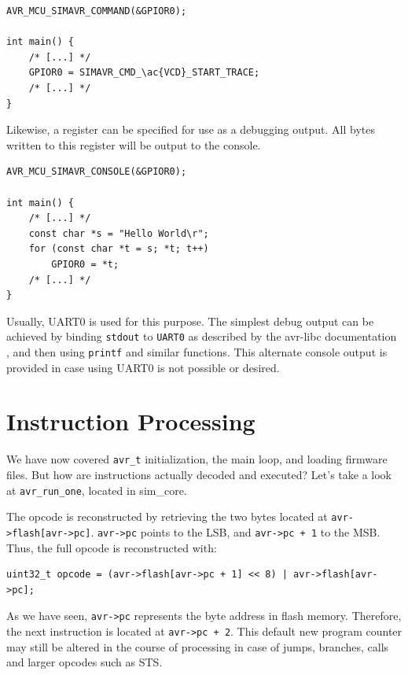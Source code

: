 \begin{lstlisting}
AVR_MCU_SIMAVR_COMMAND(&GPIOR0);

int main() {
    /* [...] */
    GPIOR0 = SIMAVR_CMD_\ac{VCD}_START_TRACE;
    /* [...] */
}
\end{lstlisting}

Likewise, a register can be specified for use as a debugging output. All bytes
written to this register will be output to the console.

\begin{lstlisting}
AVR_MCU_SIMAVR_CONSOLE(&GPIOR0);

int main() {
    /* [...] */
    const char *s = "Hello World\r";
    for (const char *t = s; *t; t++)
        GPIOR0 = *t;
    /* [...] */
}
\end{lstlisting}

Usually, UART0 is used for this purpose. The simplest debug output can be achieved
by binding \lstinline|stdout| to \lstinline|UART0| as described by the avr-libc
documentation \cite{libc}, and then using \lstinline|printf| and similar functions.
This alternate console output is provided in case using UART0 is not possible or desired.



\section{Instruction Processing} \label{section:instruction_processing}

We have now covered \lstinline|avr_t| initialization, the main loop, and loading
firmware files. But how are instructions actually decoded and executed? Let's
take a look at \lstinline|avr_run_one|, located in sim\_core.

The opcode is reconstructed by retrieving the two bytes located at
\lstinline|avr->flash[avr->pc]|. \lstinline|avr->pc| points to the \ac{LSB}, and
\lstinline|avr->pc + 1| to the \ac{MSB}. Thus, the full opcode is reconstructed with:

\begin{lstlisting}
uint32_t opcode = (avr->flash[avr->pc + 1] << 8) | avr->flash[avr->pc];
\end{lstlisting}

As we have seen, \lstinline|avr->pc| represents the byte address in flash memory.
Therefore, the next instruction is located at \lstinline|avr->pc + 2|. This
default new program counter may still be altered in the course of processing
in case of jumps, branches, calls and larger opcodes such as STS\cite{instructionset}.

